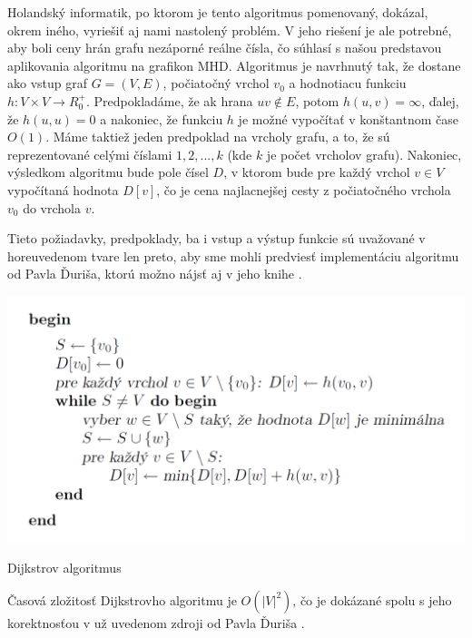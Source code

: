 Holandský informatik, po ktorom je tento algoritmus pomenovaný, dokázal, okrem iného, vyriešiť aj nami nastolený problém. V jeho riešení je ale potrebné, aby boli ceny hrán grafu nezáporné reálne čísla, čo súhlasí s našou predstavou aplikovania algoritmu na grafikon MHD. Algoritmus je navrhnutý tak, že dostane ako vstup graf $G = (V, E)$, počiatočný vrchol $v_{0}$ a hodnotiacu funkciu $h: V \times V \rightarrow R^{+}_{0}$. Predpokladáme, že ak hrana $uv \notin E$, potom $h(u,v) = \infty$, ďalej, že $h(u,u) = 0$ a nakoniec, že funkciu $h$ je možné vypočítať v konštantnom čase $O(1)$. Máme taktiež jeden predpoklad na vrcholy grafu, a to, že sú reprezentované celými číslami $1, 2, ... , k$ (kde $k$ je počet vrcholov grafu). Nakoniec, výsledkom algoritmu bude pole čísel $D$, v ktorom bude pre každý vrchol $v \in V$ vypočítaná hodnota $D [v]$, čo je cena najlacnejšej cesty z počiatočného vrchola $v_{0}$ do vrchola $v$.\newline

Tieto požiadavky, predpoklady, ba i vstup a výstup funkcie sú uvažované v horeuvedenom tvare len preto, aby sme mohli predviesť implementáciu algoritmu od Pavla Ďuriša, ktorú možno nájsť aj v jeho knihe \cite[kapitola 2.2.1]{duris2009}.\newline

\begin{algorithm}[H]
  \includegraphics[width=\linewidth]{./images/Alg_Dijkstra.png}
  \caption{Dijkstrov algoritmus}
  \label{Alg_Dijkstra}
  \centering
\end{algorithm}

Časová zložitosť Dijkstrovho algoritmu je $O(|V|^{2})$, čo je dokázané spolu s jeho korektnosťou v už uvedenom zdroji od Pavla Ďuriša \cite[kapitola 2.2.1]{duris2009}.\newline


